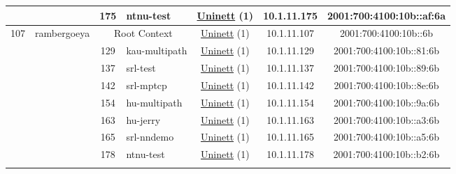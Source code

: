 \begin{small}
\begin{center}
\begin{longtable}{|c|c|c|c|c|c|c|c|}
  &  & \tiny{175} & \multicolumn{1}{|l|}{\tiny{ntnu-test}} & \multicolumn{2}{|c|}{\tiny{\href{https://www.uninett.no}{Uninett} (1)}} & \tiny{10.1.11.175} & \tiny{2001:700:4100:10b::af:6a} \\ \hline
 \multirow{9}{*}{\tiny{107}} & \multicolumn{1}{|l|}{\multirow{9}{*}{\tiny{rambergoeya}}} & \multicolumn{2}{|c|}{\tiny{Root Context}} & \multicolumn{2}{|c|}{\tiny{\href{https://www.uninett.no}{Uninett} (1)}} & \tiny{10.1.11.107} & \tiny{2001:700:4100:10b::6b} \\* \cline{3-3}\cline{4-4}\cline{5-5}\cline{6-6}\cline{7-7}\cline{8-8}
  &  & \tiny{129} & \multicolumn{1}{|l|}{\tiny{kau-multipath}} & \multicolumn{2}{|c|}{\tiny{\href{https://www.uninett.no}{Uninett} (1)}} & \tiny{10.1.11.129} & \tiny{2001:700:4100:10b::81:6b} \\* \cline{3-3}\cline{4-4}\cline{5-5}\cline{6-6}\cline{7-7}\cline{8-8}
  &  & \tiny{137} & \multicolumn{1}{|l|}{\tiny{srl-test}} & \multicolumn{2}{|c|}{\tiny{\href{https://www.uninett.no}{Uninett} (1)}} & \tiny{10.1.11.137} & \tiny{2001:700:4100:10b::89:6b} \\* \cline{3-3}\cline{4-4}\cline{5-5}\cline{6-6}\cline{7-7}\cline{8-8}
  &  & \tiny{142} & \multicolumn{1}{|l|}{\tiny{srl-mptcp}} & \multicolumn{2}{|c|}{\tiny{\href{https://www.uninett.no}{Uninett} (1)}} & \tiny{10.1.11.142} & \tiny{2001:700:4100:10b::8e:6b} \\* \cline{3-3}\cline{4-4}\cline{5-5}\cline{6-6}\cline{7-7}\cline{8-8}
  &  & \tiny{154} & \multicolumn{1}{|l|}{\tiny{hu-multipath}} & \multicolumn{2}{|c|}{\tiny{\href{https://www.uninett.no}{Uninett} (1)}} & \tiny{10.1.11.154} & \tiny{2001:700:4100:10b::9a:6b} \\* \cline{3-3}\cline{4-4}\cline{5-5}\cline{6-6}\cline{7-7}\cline{8-8}
  &  & \tiny{163} & \multicolumn{1}{|l|}{\tiny{hu-jerry}} & \multicolumn{2}{|c|}{\tiny{\href{https://www.uninett.no}{Uninett} (1)}} & \tiny{10.1.11.163} & \tiny{2001:700:4100:10b::a3:6b} \\* \cline{3-3}\cline{4-4}\cline{5-5}\cline{6-6}\cline{7-7}\cline{8-8}
  &  & \tiny{165} & \multicolumn{1}{|l|}{\tiny{srl-nndemo}} & \multicolumn{2}{|c|}{\tiny{\href{https://www.uninett.no}{Uninett} (1)}} & \tiny{10.1.11.165} & \tiny{2001:700:4100:10b::a5:6b} \\* \cline{3-3}\cline{4-4}\cline{5-5}\cline{6-6}\cline{7-7}\cline{8-8}
  &  & \tiny{178} & \multicolumn{1}{|l|}{\tiny{ntnu-test}} & \multicolumn{2}{|c|}{\tiny{\href{https://www.uninett.no}{Uninett} (1)}} & \tiny{10.1.11.178} & \tiny{2001:700:4100:10b::b2:6b} \\* \cline{3-3}\cline{4-4}\cline{5-5}\cline{6-6}\cline{7-7}\cline{8-8}

\end{longtable}
\end{center}
\end{small}
